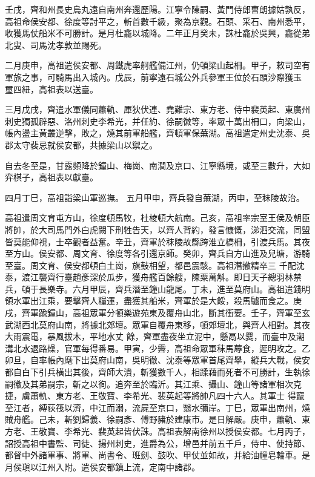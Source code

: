 \begin{pinyinscope}
 壬戌，齊和州長史烏丸遠自南州奔還歷陽。江寧令陳嗣、黃門侍郎曹朗據姑孰反，高祖命侯安都、徐度等討平之，斬首數千級，聚為京觀。石頭、采石、南州悉平，收獲馬仗船米不可勝計。是月杜龕以城降。二年正月癸未，誅杜龕於吳興，龕從弟北叟、司馬沈孝敦並賜死。



 二月庚申，高祖遣侯安都、周鐵虎率舸艦備江州，仍頓梁山起柵。甲子，敕司空有軍旅之事，可騎馬出入城內。戊辰，前寧遠石城公外兵參軍王位於石頭沙際獲玉
 璽四紐，高祖表以送臺。



 三月戊戌，齊遣水軍儀同蕭軌、厙狄伏連、堯難宗、東方老、侍中裴英起、東廣州刺史獨孤辟惡、洛州刺史李希光，并任約、徐嗣徽等，率眾十萬出柵口，向梁山，帳內盪主黃叢逆擊，敗之，燒其前軍船艦，齊頓軍保蕪湖。高祖遣定州史沈泰、吳郡太守裴忌就侯安都，共據梁山以禦之。



 自去冬至是，甘露頻降於鐘山、梅崗、南澗及京口、江寧縣境，或至三數升，大如弈棋子，高祖表以獻臺。



 四月丁巳，高祖詣梁山軍巡撫。
 五月甲申，齊兵發自蕪湖，丙申，至秣陵故治。



 高祖遣周文育屯方山，徐度頓馬牧，杜棱頓大航南。己亥，高祖率宗室王侯及朝臣將帥，於大司馬門外白虎闕下刑牲告天，以齊人背約，發言慷慨，涕泗交流，同盟皆莫能仰視，士卒觀者益奮。辛丑，齊軍於秣陵故縣跨淮立橋柵，引渡兵馬。其夜至方山。侯安都、周文育、徐度等各引還京師。癸卯，齊兵自方山進及兒塘，游騎至臺。周文育、侯安都頓白土崗，旗鼓相望，都邑震駭。高祖潛撤精卒三
 千配沈泰，渡江襲齊行臺趙彥深於瓜步，獲舟艦百餘艘，陳粟萬斛。即日天子總羽林禁兵，頓于長樂寺。六月甲辰，齊兵潛至鐘山龍尾。丁未，進至莫府山。高祖遣錢明領水軍出江乘，要擊齊人糧運，盡獲其船米，齊軍於是大餒，殺馬驢而食之。庚戌，齊軍踰鐘山，高祖眾軍分頓樂遊苑東及覆舟山北，斷其衝要。壬子，齊軍至玄武湖西北莫府山南，將據北郊壇。眾軍自覆舟東移，頓郊壇北，與齊人相對。其夜大雨震電，暴風拔木，平地水丈
 餘，齊軍盡夜坐立泥中，懸鬲以爨，而臺中及潮溝北水退路燥，官軍每得番易。甲寅，少霽，高祖命眾軍秣馬蓐食，遲明攻之。乙卯旦，自率帳內麾下出莫府山南，吳明徹、沈泰等眾軍首尾齊舉，縱兵大戰，侯安都自白下引兵橫出其後，齊師大潰，斬獲數千人，相蹂藉而死者不可勝計，生執徐嗣徽及其弟嗣宗，斬之以徇。追奔至於臨沂。其江乘、攝山、鐘山等諸軍相次克捷，虜蕭軌、東方老、王敬寶、李希光、裴英起等將帥凡四十六人。其軍士
 得竄至江者，縛荻筏以濟，中江而溺，流屍至京口，翳水彌岸。丁巳，眾軍出南州，燒賊舟艦。己未，斬劉歸義、徐嗣彥、傅野豬於建康市。是日解嚴。庚申，蕭軌、東方老、王敬寶、李希光、裴英起皆伏誅。高祖表解南徐州以授侯安都。七月丙子，詔授高祖中書監、司徒、揚州刺史，進爵為公，增邑并前五千戶，侍中、使持節、都督中外諸軍事、將軍、尚書令、班劍、鼓吹、甲仗並如故，并給油幢皂輪車。是月侯瑱以江州入附。遣侯安都鎮上流，定南中諸郡。




\end{pinyinscope}
